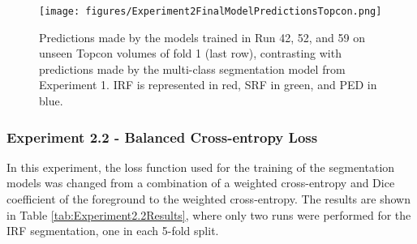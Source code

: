 \begin{figure}[!ht]
	\centering
	\texttt{[image: figures/Experiment2FinalModelPredictionsTopcon.png]}
	\caption{Predictions made by the models trained in Run 42, 52, and 59 on unseen Topcon volumes of fold 1 (last row), contrasting with predictions made by the multi-class segmentation model from Experiment 1. IRF is represented in red, SRF in green, and PED in blue.}
	\label{fig:Experiment2FinalModelPredictionsTopcon}
\end{figure}

\subsubsection{Experiment 2.2 - Balanced Cross-entropy Loss}

In this experiment, the loss function used for the training of the segmentation models was changed from a combination of a weighted cross-entropy and Dice coefficient of the foreground to the weighted cross-entropy. The results are shown in Table \ref{tab:Experiment2.2Results}, where only two runs were performed for the IRF segmentation, one in each 5-fold split. 

